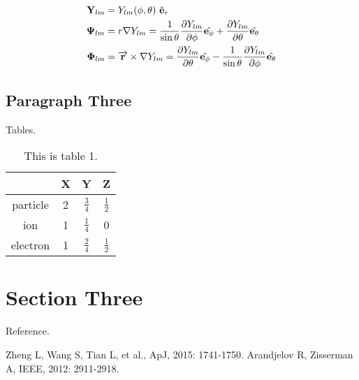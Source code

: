 \documentclass[11pt, a4paper]{article}
\numberwithin{equation}{section} %
\begin{document}
\begin{align}
	\mathbf{Y}_{l m}    & =Y_{l m}(\phi,\theta)\  \hat{\mathbf{e}}_r \\
    \mathbf{\Psi}_{l m} & =r \nabla Y_{l m}=\frac{1}{\sin \theta} \frac{\partial Y_{lm}}{\partial \phi}\hat{\mathbf{e}_{\phi}} + \frac{\partial Y_{lm}}{\partial \theta}\hat{\mathbf{e}_{\theta}} \\
    \notag
    \mathbf{\Phi}_{l m} & =\overrightarrow{\mathbf{r}} \times \nabla Y_{l m}=\frac{\partial Y_{lm}}{\partial \theta}\hat{\mathbf{e}_{\phi}} -\frac{1}{\sin \theta} \frac{\partial Y_{lm}}{\partial \phi}\hat{\mathbf{e}_{\theta}}
\end{align}

\subsection{Paragraph Three}

Tables.

\begin{table}[h]
	\renewcommand\arraystretch{2}
	\centering
	\caption{This is table 1.}
	\begin{tabular}{|c|c|c|c|}
		\hline \        & X & Y             & Z             \\
		\hline particle & 2 & $\frac{3}{4}$ & $\frac{1}{2}$ \\
		\hline ion      & 1 & $\frac{1}{4}$ & 0             \\
		\hline electron & 1 & $\frac{2}{4}$ & $\frac{1}{2}$ \\
		\hline
	\end{tabular}
\end{table}

\section{Section Three}

Reference.

\begin{thebibliography}{99}  
Zheng L, Wang S, Tian L, et al., ApJ, 2015: 1741-1750.  
Arandjelov R, Zisserman A, IEEE, 2012: 2911-2918.  
\end{thebibliography}

\end{document}
